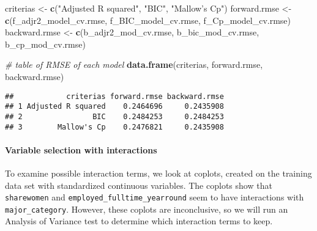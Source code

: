 \documentclass[
]{article}
\newenvironment{Shaded}{\begin{snugshade}}{\end{snugshade}}
\newcommand{\CommentTok}[1]{\textcolor[rgb]{0.56,0.35,0.01}{\textit{#1}}}
\newcommand{\KeywordTok}[1]{\textcolor[rgb]{0.13,0.29,0.53}{\textbf{#1}}}
\newcommand{\NormalTok}[1]{#1}
\newcommand{\StringTok}[1]{\textcolor[rgb]{0.31,0.60,0.02}{#1}}
\begin{document}
\begin{Shaded}
\begin{Highlighting}[]
\NormalTok{criterias <-}\StringTok{ }\KeywordTok{c}\NormalTok{(}\StringTok{"Adjusted R squared"}\NormalTok{, }\StringTok{"BIC"}\NormalTok{, }\StringTok{"Mallow's Cp"}\NormalTok{)}
\NormalTok{forward.rmse <-}\StringTok{ }\KeywordTok{c}\NormalTok{(f_adjr2_model_cv.rmse, f_BIC_model_cv.rmse, f_Cp_model_cv.rmse)}
\NormalTok{backward.rmse <-}\StringTok{ }\KeywordTok{c}\NormalTok{(b_adjr2_mod_cv.rmse, b_bic_mod_cv.rmse, b_cp_mod_cv.rmse)}

\CommentTok{# table of RMSE of each model }
\KeywordTok{data.frame}\NormalTok{(criterias, forward.rmse, backward.rmse)}
\end{Highlighting}
\end{Shaded}

\begin{verbatim}
##            criterias forward.rmse backward.rmse
## 1 Adjusted R squared    0.2464696     0.2435908
## 2                BIC    0.2484253     0.2484253
## 3        Mallow's Cp    0.2476821     0.2435908
\end{verbatim}

\hypertarget{variable-selection-with-interactions}{%
\paragraph{Variable selection with
interactions}\label{variable-selection-with-interactions}}

To examine possible interaction terms, we look at coplots, created on
the training data set with standardized continuous variables. The
coplots show that \texttt{sharewomen} and
\texttt{employed\_fulltime\_yearround} seem to have interactions with
\texttt{major\_category}. However, these coplots are inconclusive, so we
will run an Analysis of Variance test to determine which interaction
terms to keep.
\end{document}
